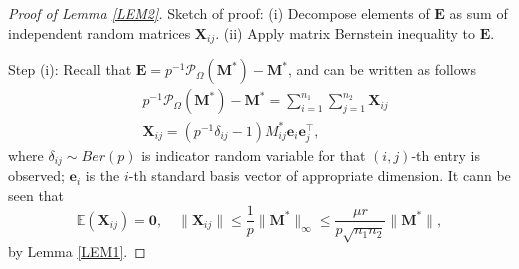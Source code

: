 \documentclass[12pt]{article}
\theoremstyle{remark}
\newcommand{\bs}[1]{{\boldsymbol{#1}^*}}
\newcommand{\bb}[1]{{\boldsymbol {#1}}}
\begin{document}
\begin{proof}[Proof of Lemma \ref{LEM2}]
Sketch of proof: (i) Decompose elements of $\bb E$ as sum of independent random matrices $\bb X_{ij}$. (ii) Apply matrix Bernstein inequality to $\bb E$.

Step (i): 
Recall that $\bb E = p^{-1} \mathcal P_\Omega (\bs M) - \bs M$, and can be written as follows
\begin{align*}
&  p^{-1} \mathcal P_\Omega (\bs M) - \bs M 
= \sum_{i = 1}^{n_1}\sum_{j = 1}^{n_2}  \bb X_{ij}\\
& \bb X_{ij} = (p^{-1}\delta_{ij}-1) M_{ij}^* \bb e_i \bb e_j^\top ,
\end{align*}
where $\delta_{ij} \sim Ber(p)$ is indicator random variable for that $(i,j)$-th entry is observed; 
$\bb e_i$ is the $i$-th standard basis vector of appropriate dimension.
It cann be seen that 
\[
\mathbb E(\bb X_{ij}) = \bb 0, \quad
\|\bb X_{ij}\| \leq \frac{1}{p}\|\bs M\|_\infty  \leq 
\frac{\mu r}{p\sqrt{n_1 n_2}}\|\bs M\|,
\]
by Lemma \ref{LEM1}. 


\end{proof}
\end{document}
